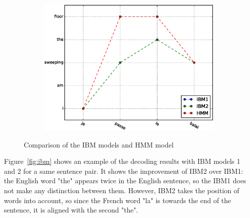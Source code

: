 \documentclass[final]{beamer}
\begin{document}
\begin{frame}[t]
\begin{multicols}{3}
\begin{figure}
\begin{subfigure}{.99\columnwidth}
  \centering
  \includegraphics[width=.99\linewidth]{figures/figures_final/sentence11.eps}
\end{subfigure}%
\caption{Comparison of the IBM models and HMM model }
\label{fig:hmm}
\end{figure}


Figure~\ref{fig:ibm} shows an example of the decoding results with IBM models 1 and 2 for a same sentence pair. It shows the improvement of IBM2 over IBM1: the English word "the" appears twice in the English sentence, so the IBM1 does not make any distinction between them. However, IBM2 takes the position of words into account, so since the French word "la" is towards the end of the sentence, it is aligned with the second "the".


\end{multicols}
\end{frame}
\end{document}
